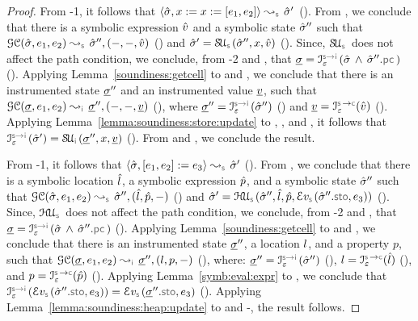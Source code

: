 \begin{proof}
 \noindent {} From \hyp{1}, it follows that $\absbsemrule{\sstate, \jvar := \jvar := [\jsilexpr_1, \jsilexpr_2]}{\sstate'}{\symbolic}$ (). 
From , we conclude that there is a symbolic expression $\hat{v}$ and a symbolic state $\hat{\sigma}''$ such that 
$\absgetcellrule{\symbolic}{\sstate, \jsilexpr_1, \jsilexpr_2}{\sstate'', (-, -, \sexprv)}$ () 
and $\sstate' = \stupdt{\symbolic}(\sstate'', \jvar, \sexprv)$ (). 
Since, $\stupdt{\symbolic}$ does not affect the path condition, we conclude, from \hyp{2} and , that
$\istate = \interpret{\symbinst}{\senv}(\sstate \, \wedge \, \sstate''.\pcsel)$ (). 
Applying Lemma~\ref{soundiness:getcell} to  and , we conclude that
there is an instrumented state $\underline{\sigma}''$ and an instrumented value $\underline{v}$, such that 
$\absgetcellrule{\instrumented}{\istate, \jsilexpr_1, \jsilexpr_2}{\istate'', (-, -, \ival)}$ (), 
where $\istate'' = \interpret{\symbinst}{\senv}(\sstate'')$ () and $\ival = \interpret{\symbconc}{\senv}(\sexprv)$ (). 
Applying Lemma~\ref{lemma:soundiness:store:update} to , , and , it follows
that  $\interpret{\symbinst}{\senv}(\sstate') = \stupdt{\instrumented}(\istate'', \jvar, \ival)$ (). 
From  and , we conclude the result. 
\vspace{5pt}

 \noindent {}
From \hyp{1}, it follows that $\absbsemrule{\sstate, [\jsilexpr_1, \jsilexpr_2] := \jsilexpr_3}{\sstate'}{\symbolic}$ (). 
From , we conclude that there is a symbolic location $\hat{l}$, a symbolic expression $\hat{p}$, and a symbolic state $\hat{\sigma}''$ such that 
$\absgetcellrule{\symbolic}{\sstate, \jsilexpr_1, \jsilexpr_2}{\sstate'', (\sloc, \sexprp, -)}$ () and 
$\sstate' = \hpupdt{\symbolic}(\sstate'', \sloc, \sexprp, \evalexpr{\symbolic}(\sstate''.\stosel, \jsilexpr_3))$ (). 
Since, $\hpupdt{\symbolic}$ does not affect the path condition, we conclude, from \hyp{2} and , that
$\istate = \interpret{\symbinst}{\senv}(\sstate \, \wedge \, \sstate''.\pcsel)$ (). 
Applying Lemma~\ref{soundiness:getcell} to  and , we conclude that
there is an instrumented state $\underline{\sigma}''$, a location $l$, and a property $p$, such that 
$\absgetcellrule{\instrumented}{\istate, \jsilexpr_1, \jsilexpr_2}{\istate'', (\loc, p, -)}$ (), 
where: $\istate'' = \interpret{\symbinst}{\senv}(\sstate'')$ (), 
 $\loc = \interpret{\symbconc}{\senv}(\sloc)$ (), and  $p = \interpret{\symbconc}{\senv}(\sexprp)$ ().
Applying Lemma~\ref{symb:eval:expr} to , we conclude that 
$\interpret{\symbinst}{\senv}(\evalexpr{\symbolic}(\sstate''.\stosel, \jsilexpr_3)) = \evalexpr{\symbolic}(\istate''.\stosel, \jsilexpr_3)$ (). 
Applying Lemma~\ref{lemma:soundiness:heap:update} to  and -, the result follows.
\vspace{5pt} 


\end{proof}
